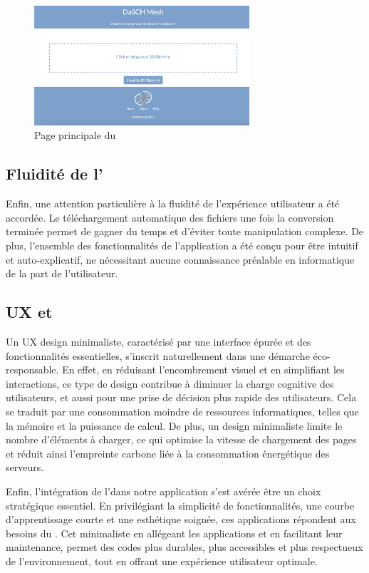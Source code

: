         \begin{figure}[h!]
            \centering
            \includegraphics[width=8cm]{02_images/part_02/02_app_dasch_mesh.png}
            \caption{Page principale du \msh}
        \end{figure}
    
        \subsection{Fluidité de l'\ux}
        Enfin, une attention particulière à la fluidité de l'expérience utilisateur a été accordée. Le téléchargement automatique des fichiers une fois la conversion terminée permet de gagner du temps et d'éviter toute manipulation complexe. De plus, l'ensemble des fonctionnalités de l'application a été conçu pour être intuitif et auto-explicatif, ne nécessitant aucune connaissance préalable en informatique de la part de l'utilisateur.

        \subsection{UX et \gco}
        Un UX design minimaliste, caractérisé par une interface épurée et des fonctionnalités essentielles, s'inscrit naturellement dans une démarche éco-responsable. En effet, en réduisant l'encombrement visuel et en simplifiant les interactions, ce type de design contribue à diminuer la charge cognitive des utilisateurs, et aussi pour une prise de décision plus rapide des utilisateurs. Cela se traduit par une consommation moindre de ressources informatiques, telles que la mémoire et la puissance de calcul. De plus, un design minimaliste limite le nombre d'éléments à charger, ce qui optimise la vitesse de chargement des pages et réduit ainsi l'empreinte carbone liée à la consommation énergétique des serveurs.
        
        Enfin, l'intégration de l'\ux dans notre application s'est avérée être un choix stratégique essentiel. En privilégiant la simplicité de fonctionnalités, une courbe d'apprentissage courte et une esthétique soignée, ces applications répondent aux besoins du \dsc. Cet \ux minimaliste en allégeant les applications et en facilitant leur maintenance, permet des codes plus durables, plus accessibles et plus respectueux de l'environnement, tout en offrant une expérience utilisateur optimale. 
        
